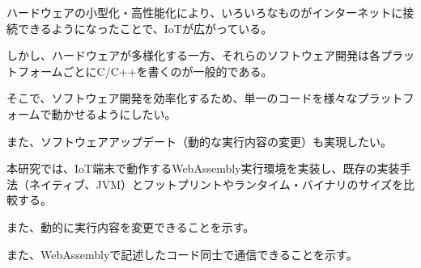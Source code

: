 \begin{jabstract}

ハードウェアの小型化・高性能化により、いろいろなものがインターネットに接続できるようになったことで、IoTが広がっている。

しかし、ハードウェアが多様化する一方、それらのソフトウェア開発は各プラットフォームごとにC/C++を書くのが一般的である。

そこで、ソフトウェア開発を効率化するため、単一のコードを様々なプラットフォームで動かせるようにしたい。

また、ソフトウェアアップデート（動的な実行内容の変更）も実現したい。

本研究では、IoT端末で動作するWebAssembly実行環境を実装し、既存の実装手法（ネイティブ、JVM）とフットプリントやランタイム・バイナリのサイズを比較する。

また、動的に実行内容を変更できることを示す。

また、WebAssemblyで記述したコード同士で通信できることを示す。

\end{jabstract}
